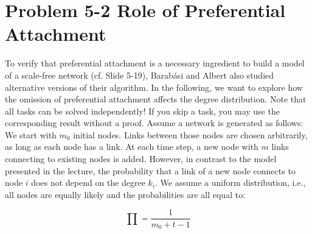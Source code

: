\section{Problem 5-2 Role of Preferential Attachment}

To verify that preferential attachment is a necessary ingredient to build a model of a scale-free network (cf. Slide 5-19), Barab\'{a}si and Albert also studied alternative versions of their algorithm. In the following, we want to explore how the omission of preferential attachment affects the degree distribution. Note that all tasks can be solved independently! If you skip a task, you may use the corresponding result without a proof.
Assume a network is generated as follows: We start with $m_0$ initial nodes. Links between those nodes are chosen arbitrarily, as long as each node has a link. At each time step, a new node with $m$ links connecting to existing nodes is added. However, in contrast to the model presented in the lecture, the probability that a link of a new node connects to node $i$ does not depend on the degree $k_i$. We assume a uniform distribution, i.e., all nodes are equally likely and the probabilities are all equal to:

\begin{equation} \label{eq:1}
	\prod = \frac{1}{m_0 + t - 1}
\end{equation}

